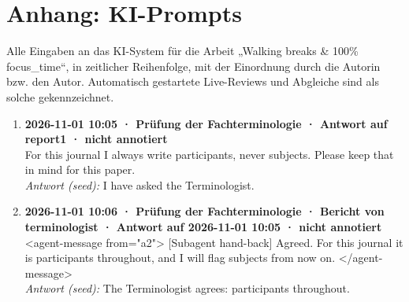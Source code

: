 \section*{Anhang: KI-Prompts}

Alle Eingaben an das KI-System für die Arbeit „Walking breaks \& 100\% focus\_time“, in zeitlicher Reihenfolge, mit der Einordnung durch die Autorin bzw. den Autor. Automatisch gestartete Live-Reviews und Abgleiche sind als solche gekennzeichnet.

\begin{enumerate}
  \item \textbf{2026-11-01 10:05 · Prüfung der Fachterminologie · Antwort auf report1 · nicht annotiert} \\
  For this journal I always write participants, never subjects. Please keep that in mind for this paper.
  \\ \textit{Antwort (seed):} I have asked the Terminologist.
  \item \textbf{2026-11-01 10:06 · Prüfung der Fachterminologie · Bericht von terminologist · Antwort auf 2026-11-01 10:05 · nicht annotiert} \\
  <agent-message from="a2"> [Subagent hand-back] Agreed. For this journal it is participants throughout, and I will flag subjects from now on. </agent-message>
  \\ \textit{Antwort (seed):} The Terminologist agrees: participants throughout.
\end{enumerate}
